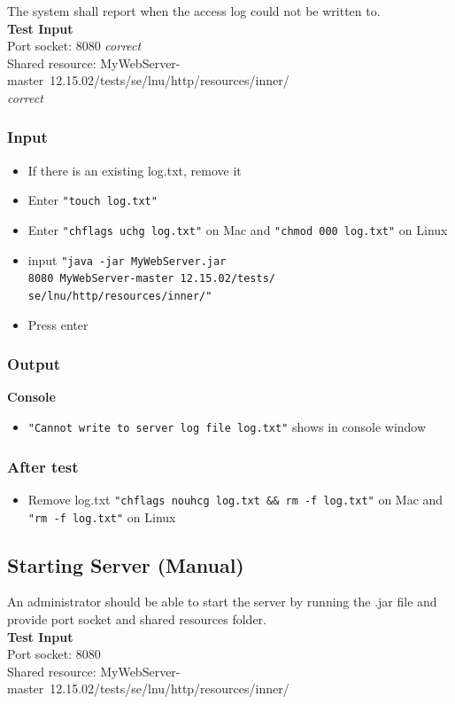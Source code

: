 \documentclass[a4paper, 12pt]{article}
\begin{document}
The system shall report when the access log could not be written to.\\
\textbf{Test Input} \\ Port socket: 8080 \textit{correct} \\ Shared resource: MyWebServer-master\ 12.15.02/tests/se/lnu/http/resources/inner/ \\ \textit{correct}
 
\subsubsection{Input}
\begin{itemize}
\item If there is an existing log.txt, remove it
\item Enter \texttt{"touch log.txt"}
\item Enter \texttt{"chflags uchg log.txt"} on Mac and \texttt{"chmod 000 log.txt"} on Linux
\item input \texttt{"java -jar MyWebServer.jar \\ 8080 MyWebServer-master\ 12.15.02/tests/\\se/lnu/http/resources/inner/"}
\item Press enter
\end{itemize} 

\subsubsection{Output}
\textbf{Console}
\begin{itemize}
\item \texttt{"Cannot write to server log file log.txt"} shows in console window
\end{itemize}

\subsubsection{After test}
\begin{itemize}
\item Remove log.txt \texttt{"chflags nouhcg log.txt \&\& rm -f log.txt"} on Mac and \texttt{"rm -f log.txt"} on Linux
\end{itemize}

\subsection{Starting Server (Manual)}

An administrator should be able to start the server by running the .jar file and provide port socket and shared resources folder.\\
\textbf{Test Input} \\ Port socket: 8080 \\ Shared resource: MyWebServer-master\ 12.15.02/tests/se/lnu/http/resources/inner/
\end{document}
